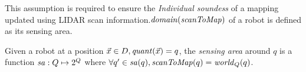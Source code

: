 This assumption is required to ensure the \emph{Individual soundess} of a mapping updated using LIDAR scan information.$\mathit{domain}(\mathit{scanToMap})$ of a robot is defined as its sensing area.





\begin{definition}
   Given a robot at a position $\Vec{x}\in D, \mathit{quant}(\Vec{x}) = q$, the \emph{sensing area} around $q$ is a function $\mathit{sa}: Q \mapsto 2^{Q}$ where $\forall q^\prime \in \mathit{sa}(q), \mathit{scanToMap}(q) = \mathit{world}_Q(q)$.
\end{definition}





